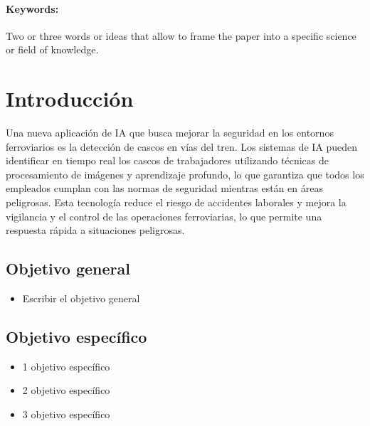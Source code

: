 \documentclass[a4paper,12pt]{article}
\begin{document}
{\paragraph{Keywords:} Two or three words or ideas that allow to frame the paper into a specific science or field of knowledge.







\newpage


\tableofcontents

\newpage



\section{Introducción}

Una nueva aplicación de IA que busca mejorar la seguridad en los entornos ferroviarios es la detección de cascos en vías del tren. Los sistemas de IA pueden identificar en tiempo real los cascos de trabajadores utilizando técnicas de procesamiento de imágenes y aprendizaje profundo, lo que garantiza que todos los empleados cumplan con las normas de seguridad mientras están en áreas peligrosas. Esta tecnología reduce el riesgo de accidentes laborales y mejora la vigilancia y el control de las operaciones ferroviarias, lo que permite una respuesta rápida a situaciones peligrosas.


\subsection{\textbf{Objetivo general}}
\begin{itemize}
    \item Escribir el objetivo general
\end{itemize}

\subsection{\textbf{Objetivo específico}}
\begin{itemize}
    \item 1 objetivo específico
    \item 2 objetivo específico
    \item 3 objetivo específico
\end{itemize}

}
\end{document}
